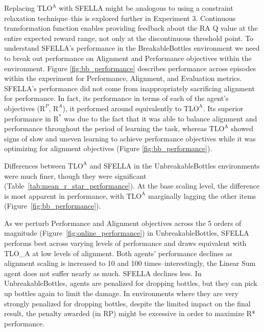 Replacing $\text{TLO}^\text{A}$ with SFELLA might be analogous to using a constraint relaxation technique--this is explored further in Experiment 3. %
Continuous transformation function enables providing feedback about the RA Q value at the entire expected reward range, not only at the discontinuous threshold point.
To understand SFELLA's performance in the BreakableBottles environment we need to break out performance on Alignment and Performance objectives within the environment. Figure \ref{fig:bb_performance} describes performance across episodes within the experiment for Performance, Alignment, and Evaluation metrics. SFELLA's performance did not come from inappropriately sacrificing alignment for performance. In fact, its performance in terms of each of the agent's objectives ($\text{R}^P$, $\text{R}^A$), it performed around equivalently to $\text{TLO}^\text{A}$. Its superior performance in $\text{R}^*$ was due to the fact that it was able to balance alignment and performance throughout the period of learning the task, whereas $\text{TLO}^\text{A}$ showed signs of slow and uneven learning to achieve performance objectives while it was optimizing for alignment objectives (Figure \ref{fig:bb_performance}).

Differences between $\text{TLO}^\text{A}$ and SFELLA in the UnbreakableBottles environments were much finer, though they were significant (Table~\ref{tab:mean_r_star_performance}). At the base scaling level, the difference is most apparent in performance, with $\text{TLO}^\text{A}$ marginally lagging the other items (Figure~\ref{fig:bb_performance}). 

As we perturb Performance and Alignment objectives across the 5 orders of magnitude (Figure~\ref{fig:online_performance}) in UnbreakableBottles, SFELLA performs best across varying levels of performance and draws equivalent with TLO\_A at low levels of alignment. Both agents' performance declines as alignment scaling is increased to 10 and 100 times--interestingly, the Linear Sum agent does not suffer nearly as much. SFELLA declines less. In UnbreakableBottles, agents are penalized for dropping bottles, but they can pick up bottles again to limit the damage. In environments where they are very strongly penalized for dropping bottles, despite the limited impact on the final result, the penalty awarded (in RP) might be excessive in order to maximize R* performance.

